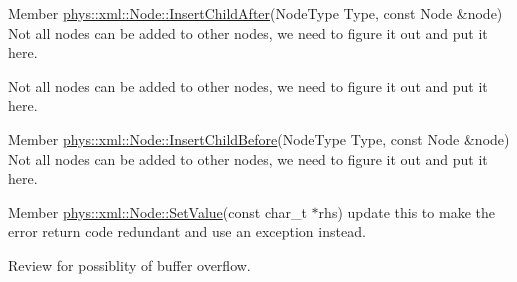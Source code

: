 \label{todo__todo000046}
\hypertarget{todo__todo000046}{}
 
\begin{DoxyDescription}
\item[Member \hyperlink{classphys_1_1xml_1_1Node_affc4d9cc0ea7c89bac58d91a432af2ef}{phys::xml::Node::InsertChildAfter}(NodeType Type, const Node \&node) ]Not all nodes can be added to other nodes, we need to figure it out and put it here. 

Not all nodes can be added to other nodes, we need to figure it out and put it here. 
\end{DoxyDescription}

\label{todo__todo000041}
\hypertarget{todo__todo000041}{}
 
\begin{DoxyDescription}
\item[Member \hyperlink{classphys_1_1xml_1_1Node_a691684896ab5d29a634415e745aaec7a}{phys::xml::Node::InsertChildBefore}(NodeType Type, const Node \&node) ]Not all nodes can be added to other nodes, we need to figure it out and put it here. 
\end{DoxyDescription}

\label{todo__todo000040}
\hypertarget{todo__todo000040}{}
 
\begin{DoxyDescription}
\item[Member \hyperlink{classphys_1_1xml_1_1Node_a50ff9948dac721339561ed3442fb7034}{phys::xml::Node::SetValue}(const char\_\-t $\ast$rhs) ]update this to make the error return code redundant and use an exception instead. 

Review for possiblity of buffer overflow. 
\end{DoxyDescription}